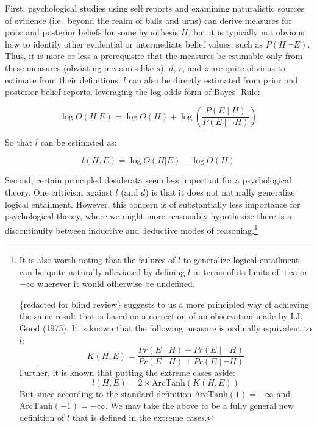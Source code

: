 \documentclass[10pt, letterpaper]{article}
\begin{document}
First, psychological studies using self reports and examining
naturalistic sources of evidence (i.e.~beyond the realm of balls and
urns) can derive measures for prior and posterior beliefs for some
hypothesis \(H\), but it is typically not obvious how to identify other
evidential or intermediate belief values, such as \(P(H|\neg E)\). Thus,
it is more or less a prerequisite that the measures be estimable only
from these measures (obviating measures like \(s\)). \(d\), \(r\), and
\(z\) are quite obvious to estimate from their definitions. \(l\) can
also be directly estimated from prior and posterior belief reports,
leveraging the log-odds form of Bayes' Rule:

\[\log O(H|E) = \log O(H) + \log\left(\frac{P(E \mid H)}{P(E \mid \neg H)}\right)\]

So that \(l\) can be estimated as:

\[l(H,E) = \log O(H|E) - \log O(H)\]

Second, certain principled desiderata seem less important for a
psychological theory. One criticism against \(l\) (and \(d\)) is that it
does not naturally generalize logical entailment. However, this concern
is of substantially less importance for psychological theory, where we
might more reasonably hypothesize there is a discontinuity between
inductive and deductive modes of reasoning.\footnote{It is also worth
  noting that the failures of \(l\) to generalize logical entailment can
  be quite naturally alleviated by defining \(l\) in terms of its limits
  of \(+ \infty\) or \(- \infty\) wherever it would otherwise be
  undefined.

  \{redacted for blind review\} suggests to us a more principled way of
  achieving the same result that is based on a correction of an
  observation made by I.J. Good (1975). It is known that the following
  measure is ordinally equivalent to
  \(l\):\[K(H,E)=\frac{Pr(E \mid H)-Pr(E \mid \neg H)}{Pr(E \mid H)+Pr(E \mid \neg H)}\]
  Further, it is known that putting the extreme cases
  aside:\[l(H,E)=2 \times \text{ArcTanh}\left(K(H,E)\right)\]But since
  according to the standard definition \(\text{ArcTanh}(1)=+\infty\) and
  \(\text{ArcTanh}(-1)=-\infty\). We may take the above to be a fully
  general new definition of \(l\) that is defined in the extreme cases.}
\end{document}
